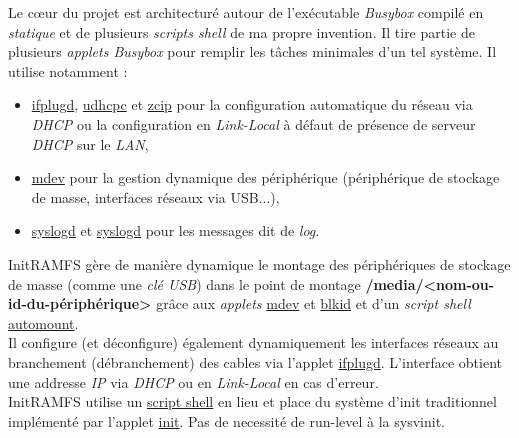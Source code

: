 \documentclass[a4paper]{article}
\begin{document}
Le c\oe{}ur du projet est architecturé autour de l'exécutable \textit{Busybox} compilé en \textit{statique} et de plusieurs \textit{scripts shell} de ma propre invention. Il tire partie de plusieurs \textit{applets Busybox} pour remplir les tâches minimales d'un tel système. Il utilise notamment :
\begin{itemize}
\item \href{http://www.busybox.net/downloads/BusyBox.html#ifplugd}{ifplugd}, \href{http://www.busybox.net/downloads/BusyBox.html#udhcpc}{udhcpc} et \href{http://www.busybox.net/downloads/BusyBox.html#zcip}{zcip} pour la configuration automatique du réseau via \textit{DHCP} ou la configuration en \textit{Link-Local} à défaut de présence de serveur \textit{DHCP} sur le \textit{LAN},
\item \href{http://www.busybox.net/downloads/BusyBox.html#mdev}{mdev} pour la gestion dynamique des périphérique (périphérique de stockage de masse, interfaces réseaux via USB...),
\item \href{http://www.busybox.net/downloads/BusyBox.html#syslogd}{syslogd} et \href{http://www.busybox.net/downloads/BusyBox.html#klogd}{syslogd} pour les messages dit de \textit{log}.
\end{itemize}

InitRAMFS gère de manière dynamique le montage des périphériques de stockage de masse (comme une \textit{clé USB}) dans le point de montage \textbf{/media/<nom-ou-id-du-périphérique>} grâce aux \textit{applets} \href{http://www.busybox.net/downloads/BusyBox.html#mdev}{mdev} et \href{http://www.busybox.net/downloads/BusyBox.html#blkid}{blkid} et d'un \textit{script shell} \href{https://github.com/gazoo74/initramfs/blob/old-fixes-and-dev-need-study/packages-initramfs/mdev/usr/sbin/automount}{automount}.\\

Il configure (et déconfigure) également dynamiquement les interfaces réseaux au branchement (débranchement) des cables via l'applet \href{http://www.busybox.net/downloads/BusyBox.html#ifplugd}{ifplugd}. L'interface obtient une addresse \textit{IP} via \textit{DHCP} ou en \textit{Link-Local} en cas d'erreur.\\

InitRAMFS utilise un \href{https://github.com/gazoo74/initramfs/blob/master/packages-initramfs/ramfs/etc/init}{script shell} en lieu et place du système d'init traditionnel implémenté par l'applet \href{http://www.busybox.net/downloads/BusyBox.html#init}{init}. Pas de necessité de run-level à la sysvinit.\\
\end{document}
